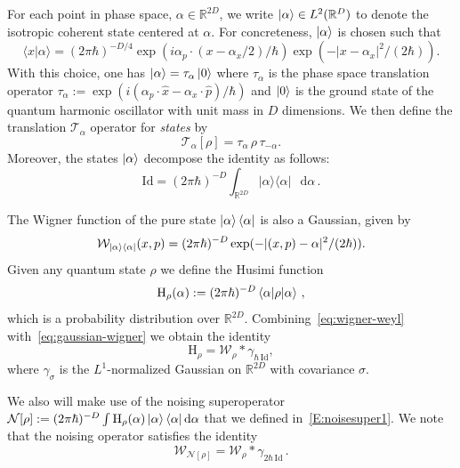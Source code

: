 \documentclass[11pt]{amsart}
\def\Wigner{{\mathcal W}}
\def\Husimi{{\mathrm{H}}}
\def\Id{\mathrm{Id}}
\def\Real{{\mathbb R}}
\newcommand{\diff}{\mathop{}\!\mathrm{d}}
\newcommand{\mcal}[1]{{\mathcal{#1}}}
\def\bra#1{\mathinner{\langle{#1}|}}
\def\ket#1{\mathinner{|{#1}\rangle}}
\def\braket#1{\mathinner{\langle{#1}\rangle}}
\numberwithin{equation}{section}
\begin{document}
For each point in phase space, $\alpha\in\Real^{2D}$, we write
$\ket{\alpha} \in L^2(\Real^D)$ to denote the isotropic coherent state centered at $\alpha$.  For concreteness, $\ket{\alpha}$ is
chosen such that
\[
\langle x | \alpha \rangle = (2\pi \hbar)^{-D/4} \exp(i \alpha_p\cdot(x-\alpha_x/2)/\hbar)\exp(-|x-\alpha_x|^2 / (2\hbar)).
\]
With this choice, one has $\ket{\alpha} = \tau_\alpha \ket{0}$ where $\tau_\alpha$ is the phase space translation operator
$\tau_\alpha := \exp(i (\alpha_p \cdot\hat{x}-  \alpha_x \cdot \hat{p})/\hbar)$ and $\ket{0}$ is the ground state of the quantum harmonic oscillator with unit mass in $D$ dimensions.  We then define the
translation $\mcal{T}_\alpha$ operator for \textit{states} by
\begin{equation}
\label{eq:Talpha-def}
\mcal{T}_\alpha[\rho] = \tau_\alpha \,\rho\, \tau_{-\alpha}.
\end{equation}
Moreover, the states $\ket{\alpha}$ decompose the identity as follows:
\[
\Id = (2\pi \hbar)^{-D} \int_{\Real^{2D}} |\alpha\rangle \langle \alpha |\,\diff\alpha\,.
\]

The Wigner function of the pure state $\ket{\alpha}\bra{\alpha}$ is also a Gaussian, given by
\begin{equation}
\label{eq:gaussian-wigner}
\Wigner_{\ket{\alpha}\bra{\alpha}}(x,p) = (2\pi\hbar)^{-D} \exp(-|(x,p)-\alpha|^2/(2\hbar)).
\end{equation}
Given any quantum state $\rho$ we define the Husimi function
\begin{equation}
\label{eq:Husimi-def}
\Husimi_\rho(\alpha) := (2\pi\hbar)^{-D}\braket{\alpha| \rho |\alpha}\,,
\end{equation}
which is a probability distribution over $\mathbb{R}^{2D}$.  Combining~\eqref{eq:wigner-weyl} with~\eqref{eq:gaussian-wigner} we obtain the identity
\[
\Husimi_\rho = \Wigner_\rho \ast \gamma_{\hbar\,\Id},
\]
where $\gamma_\sigma$ is the $L^1$-normalized Gaussian on $\Real^{2D}$ with covariance $\sigma$.

We also will make use of the noising superoperator $\mcal{N}[\rho] := (2\pi\hbar)^{-D} \int \Husimi_\rho(\alpha) \ket{\alpha}\bra{\alpha}\diff \alpha$ that we defined in~\eqref{E:noisesuper1}. We note that the noising operator satisfies the identity
\begin{equation}
\label{eq:noising-identity}
\Wigner_{\mcal{N}[\rho]} = \Wigner_\rho \ast \gamma_{2\hbar\,\Id}\,.
\end{equation}
\end{document}
